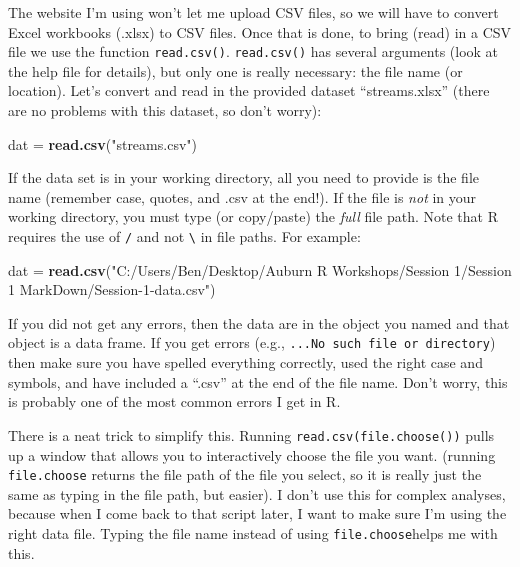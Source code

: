 \documentclass[]{book}
\newenvironment{Shaded}{\begin{snugshade}}{\end{snugshade}}
\newcommand{\KeywordTok}[1]{\textcolor[rgb]{0.13,0.29,0.53}{\textbf{#1}}}
\newcommand{\StringTok}[1]{\textcolor[rgb]{0.31,0.60,0.02}{#1}}
\newcommand{\NormalTok}[1]{#1}
\theoremstyle{definition}
\theoremstyle{definition}
\theoremstyle{definition}
\theoremstyle{remark}
\begin{document}
The website I'm using won't let me upload CSV files, so we will have to
convert Excel workbooks (.xlsx) to CSV files. Once that is done, to
bring (read) in a CSV file we use the function \texttt{read.csv()}.
\texttt{read.csv()} has several arguments (look at the help file for
details), but only one is really necessary: the file name (or location).
Let's convert and read in the provided dataset ``streams.xlsx'' (there
are no problems with this dataset, so don't worry):

\begin{Shaded}
\begin{Highlighting}[]
\NormalTok{dat =}\StringTok{ }\KeywordTok{read.csv}\NormalTok{(}\StringTok{"streams.csv"}\NormalTok{)}
\end{Highlighting}
\end{Shaded}

If the data set is in your working directory, all you need to provide is
the file name (remember case, quotes, and .csv at the end!). If the file
is \emph{not} in your working directory, you must type (or copy/paste)
the \emph{full} file path. Note that R requires the use of \texttt{/}
and not \texttt{\textbackslash{}} in file paths. For example:

\begin{Shaded}
\begin{Highlighting}[]
\NormalTok{dat =}\StringTok{ }\KeywordTok{read.csv}\NormalTok{(}\StringTok{"C:/Users/Ben/Desktop/Auburn R Workshops/Session 1/Session 1 MarkDown/Session-1-data.csv"}\NormalTok{)}
\end{Highlighting}
\end{Shaded}

If you did not get any errors, then the data are in the object you named
and that object is a data frame. If you get errors (e.g.,
\texttt{...No\ such\ file\ or\ directory}) then make sure you have
spelled everything correctly, used the right case and symbols, and have
included a ``.csv'' at the end of the file name. Don't worry, this is
probably one of the most common errors I get in R.

There is a neat trick to simplify this. Running
\texttt{read.csv(file.choose())} pulls up a window that allows you to
interactively choose the file you want. (running \texttt{file.choose}
returns the file path of the file you select, so it is really just the
same as typing in the file path, but easier). I don't use this for
complex analyses, because when I come back to that script later, I want
to make sure I'm using the right data file. Typing the file name instead
of using \texttt{file.choose}helps me with this.
\end{document}
